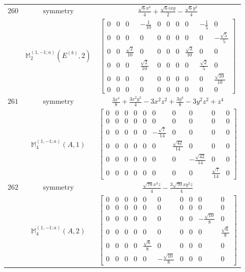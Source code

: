 \documentclass[fleqn,8pt,landscape]{jsarticle}
\begin{document}
\begin{longtable}{ccc}
$ 260 $ & $ \text{symmetry} $ & $ \frac{\sqrt{6} x^{2}}{4} + \frac{\sqrt{6} i x y}{2} - \frac{\sqrt{6} y^{2}}{4} $ \\
$  $ & $ \mathbb{M}_{2}^{(1,-1;a)}(E^{(b)},2) $ & $ \begin{bmatrix} 0 & 0 & 0 & - \frac{1}{10} & 0 & 0 & 0 & 0 & - \frac{1}{5} & 0 \\ 0 & 0 & 0 & 0 & 0 & 0 & 0 & 0 & 0 & - \frac{\sqrt{5}}{5} \\ 0 & 0 & \frac{\sqrt{2}}{10} & 0 & 0 & 0 & 0 & \frac{\sqrt{3}}{10} & 0 & 0 \\ 0 & 0 & 0 & \frac{\sqrt{2}}{10} & 0 & 0 & 0 & 0 & \frac{\sqrt{2}}{5} & 0 \\ 0 & 0 & 0 & 0 & 0 & 0 & 0 & 0 & 0 & \frac{\sqrt{10}}{10} \\ 0 & 0 & 0 & 0 & 0 & 0 & 0 & 0 & 0 & 0 \end{bmatrix} $ \\ \hline
$ 261 $ & $ \text{symmetry} $ & $ \frac{3 x^{4}}{8} + \frac{3 x^{2} y^{2}}{4} - 3 x^{2} z^{2} + \frac{3 y^{4}}{8} - 3 y^{2} z^{2} + z^{4} $ \\
$  $ & $ \mathbb{M}_{4}^{(1,-1;a)}(A,1) $ & $ \begin{bmatrix} 0 & 0 & 0 & 0 & 0 & 0 & 0 & 0 & 0 & 0 \\ 0 & 0 & 0 & 0 & 0 & 0 & 0 & 0 & 0 & 0 \\ 0 & 0 & 0 & 0 & 0 & - \frac{\sqrt{7}}{14} & 0 & 0 & 0 & 0 \\ 0 & 0 & 0 & 0 & 0 & 0 & \frac{\sqrt{42}}{14} & 0 & 0 & 0 \\ 0 & 0 & 0 & 0 & 0 & 0 & 0 & - \frac{\sqrt{42}}{14} & 0 & 0 \\ 0 & 0 & 0 & 0 & 0 & 0 & 0 & 0 & \frac{\sqrt{7}}{14} & 0 \end{bmatrix} $ \\ \hline
$ 262 $ & $ \text{symmetry} $ & $ \frac{\sqrt{70} x^{3} z}{4} - \frac{3 \sqrt{70} x y^{2} z}{4} $ \\
$  $ & $ \mathbb{M}_{4}^{(1,-1;a)}(A,2) $ & $ \begin{bmatrix} 0 & 0 & 0 & 0 & 0 & 0 & 0 & 0 & 0 & 0 \\ 0 & 0 & 0 & 0 & 0 & 0 & 0 & 0 & 0 & 0 \\ 0 & 0 & 0 & 0 & 0 & 0 & 0 & 0 & - \frac{\sqrt{10}}{8} & 0 \\ 0 & 0 & 0 & 0 & 0 & 0 & 0 & 0 & 0 & \frac{\sqrt{6}}{8} \\ 0 & 0 & 0 & 0 & \frac{\sqrt{6}}{8} & 0 & 0 & 0 & 0 & 0 \\ 0 & 0 & 0 & 0 & 0 & - \frac{\sqrt{10}}{8} & 0 & 0 & 0 & 0 \end{bmatrix} $ \\ \hline

\end{longtable}
\end{document}
